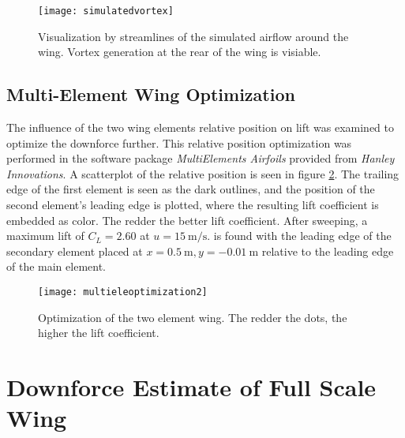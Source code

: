   \begin{figure}
    \texttt{[image: simulatedvortex]}
    \caption{Visualization by streamlines of the simulated airflow around the wing. Vortex generation at the rear of the wing is visiable.}
    \label{fig:simvortex}
  \end{figure}

  \subsection{Multi-Element Wing Optimization}
  The influence of the two wing elements relative position on lift was examined to optimize the downforce further. This relative position optimization was performed in the software package \emph{MultiElements Airfoils} provided from \emph{Hanley Innovations}. A scatterplot of the relative position is seen in figure \ref{fig:multieleoptimization}. The trailing edge of the first element is seen as the dark outlines, and the position of the second element's leading edge is plotted, where the resulting lift coefficient is embedded as color. The redder the better lift coefficient. After sweeping, a maximum lift of $C_L = 2.60$  at $u = \SI{15}{\metre\per\second}$. is found with the leading edge of the secondary element placed at $x=\SI{0.5}{\metre},y=\SI{-0.01}{\metre}$ relative to the leading edge of the main element.

  \begin{figure}
    \texttt{[image: multieleoptimization2]}
    \caption{Optimization of the two element wing. The redder the dots, the higher the lift coefficient.}
    \label{fig:multieleoptimization}
  \end{figure}

\section{Downforce Estimate of Full Scale Wing}
